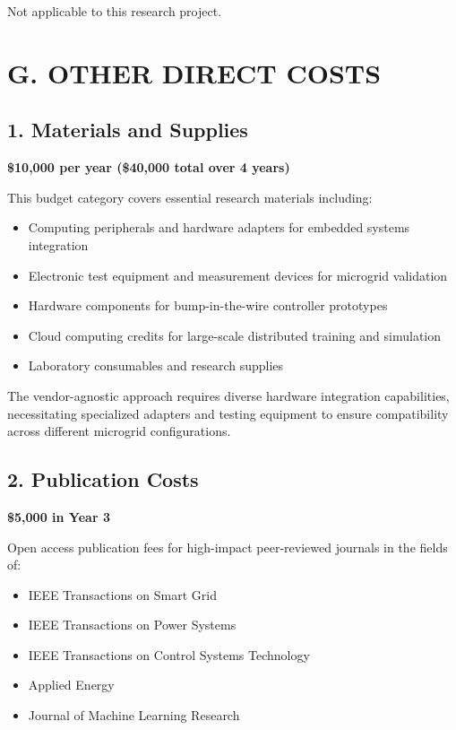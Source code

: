 \documentclass[12pt]{article}
\begin{document}
Not applicable to this research project.

\section{G. OTHER DIRECT COSTS}

\subsection{1. Materials and Supplies}

\textbf{\$10,000 per year (\$40,000 total over 4 years)}

This budget category covers essential research materials including:
\begin{itemize}
    \item Computing peripherals and hardware adapters for embedded systems integration
    \item Electronic test equipment and measurement devices for microgrid validation
    \item Hardware components for bump-in-the-wire controller prototypes
    \item Cloud computing credits for large-scale distributed training and simulation
    \item Laboratory consumables and research supplies
\end{itemize}

The vendor-agnostic approach requires diverse hardware integration capabilities, necessitating specialized adapters and testing equipment to ensure compatibility across different microgrid configurations.

\subsection{2. Publication Costs}

\textbf{\$5,000 in Year 3}

Open access publication fees for high-impact peer-reviewed journals in the fields of:
\begin{itemize}
    \item IEEE Transactions on Smart Grid
    \item IEEE Transactions on Power Systems
    \item IEEE Transactions on Control Systems Technology
    \item Applied Energy
    \item Journal of Machine Learning Research
\end{itemize}
\end{document}
